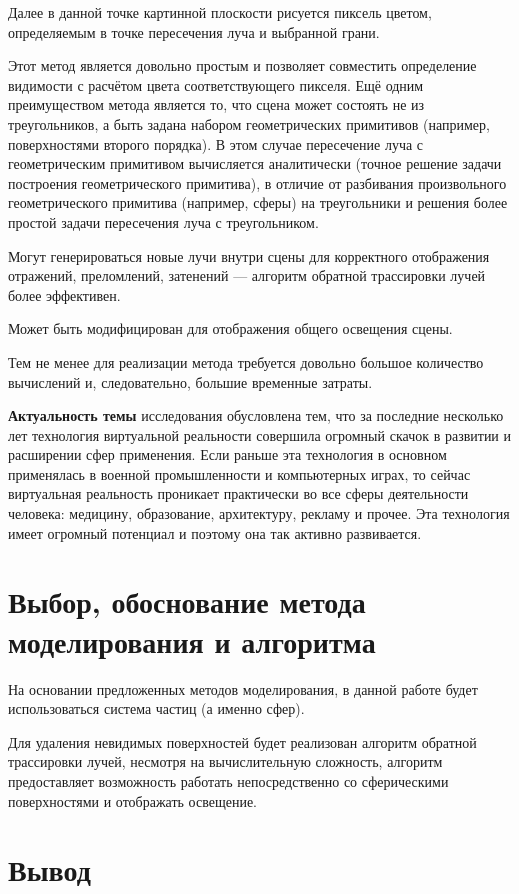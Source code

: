  Далее в данной точке картинной плоскости рисуется пиксель цветом, определяемым в точке пересечения луча и выбранной грани. 
 
 Этот метод является довольно простым и позволяет совместить определение видимости с расчётом цвета соответствующего пикселя. Ещё одним преимуществом метода является то, что сцена может состоять не из треугольников, а быть задана набором геометрических примитивов (например, поверхностями второго порядка). В этом случае пересечение луча с геометрическим примитивом вычисляется аналитически (точное решение задачи построения геометрического примитива), в отличие от разбивания произвольного геометрического примитива (например, сферы) на треугольники и решения более простой задачи пересечения луча с треугольником. 
 
 Могут генерироваться новые лучи внутри сцены для корректного отображения отражений, преломлений, затенений --- алгоритм обратной трассировки лучей более эффективен.
 
Может быть модифицирован для отображения общего освещения сцены. 

Тем не менее для реализации метода требуется довольно большое количество вычислений и, следовательно, большие временные затраты. 


\textbf{Актуальность темы} исследования обусловлена тем, что за последние несколько лет технология виртуальной реальности совершила огромный скачок в развитии и расширении сфер применения. Если раньше эта технология в основном применялась в военной промышленности и компьютерных играх, то сейчас виртуальная реальность проникает практически во все сферы деятельности человека: медицину, образование, архитектуру, рекламу и прочее. Эта технология имеет огромный потенциал и поэтому она так активно развивается.

\section{\textbf{Выбор, обоснование метода моделирования и алгоритма}}

На основании предложенных методов моделирования, в данной работе будет использоваться система частиц (а именно сфер). 

Для удаления невидимых поверхностей будет реализован алгоритм обратной трассировки лучей, несмотря на вычислительную сложность, алгоритм предоставляет возможность работать непосредственно со сферическими поверхностями и отображать освещение. 

\section{\textbf{Вывод}}

